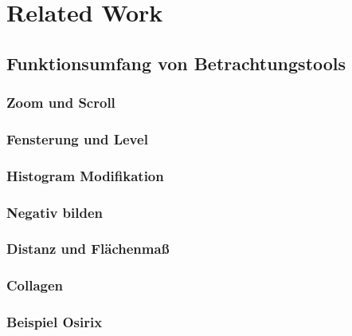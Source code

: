 \section{Related Work}
\label{sec:relatedWork}

\subsection{Funktionsumfang von Betrachtungstools}
\label{sec:Funktionsumfang von Betrachtungstools}

\subsubsection{Zoom und Scroll}
\subsubsection{Fensterung und Level}
\subsubsection{Histogram Modifikation}
\subsubsection{Negativ bilden}
\subsubsection{Distanz und Flächenmaß}
\subsubsection{Collagen}
\subsubsection{Beispiel Osirix}
\label{sec:Beispiel Osirix}

